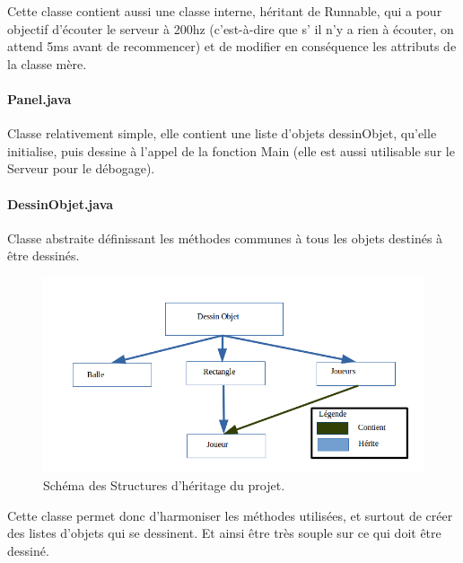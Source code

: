 \documentclass[a4paper,12pt]{report}
\begin{document}
Cette classe contient aussi une classe interne, héritant de Runnable, qui a pour objectif d'écouter le serveur à 200hz (c'est-à-dire que s’ il n'y a rien à écouter, on attend 5ms avant de recommencer) et de modifier en conséquence les attributs de la classe mère.

\paragraph{Panel.java}

Classe relativement simple, elle contient une liste d'objets dessinObjet, qu'elle initialise, puis dessine à l'appel de la fonction Main (elle est aussi utilisable sur le Serveur pour le débogage).




\paragraph{DessinObjet.java}

Classe abstraite définissant les méthodes communes à tous les objets destinés à être dessinés.

\begin{figure}[H]

\begin{center}

\includegraphics[width=17cm]{pictures/heritage.png}

\end{center}

\caption{Schéma des Structures d'héritage du projet.}

\end{figure}

Cette classe permet donc d'harmoniser les méthodes utilisées, et surtout de créer des listes d'objets qui se dessinent. Et ainsi être très souple sur ce qui doit être dessiné.
\end{document}
